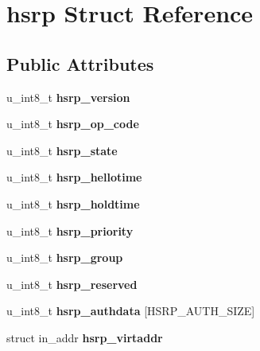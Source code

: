 \hypertarget{structhsrp}{
\section{hsrp Struct Reference}
\label{structhsrp}
}
\subsection*{Public Attributes}
\begin{DoxyCompactItemize}
\item 
\hypertarget{structhsrp_a6835c7a2ab83602e41712e873e6d8858}{
u\_\-int8\_\-t {\bfseries hsrp\_\-version}}
\label{structhsrp_a6835c7a2ab83602e41712e873e6d8858}

\item 
\hypertarget{structhsrp_a391fb22050fd87eb16694753ba115d13}{
u\_\-int8\_\-t {\bfseries hsrp\_\-op\_\-code}}
\label{structhsrp_a391fb22050fd87eb16694753ba115d13}

\item 
\hypertarget{structhsrp_a65bf3b6dafe413da5caa3d83489ac1ae}{
u\_\-int8\_\-t {\bfseries hsrp\_\-state}}
\label{structhsrp_a65bf3b6dafe413da5caa3d83489ac1ae}

\item 
\hypertarget{structhsrp_a0f004d2061c915047dce3a04b90cf6f6}{
u\_\-int8\_\-t {\bfseries hsrp\_\-hellotime}}
\label{structhsrp_a0f004d2061c915047dce3a04b90cf6f6}

\item 
\hypertarget{structhsrp_aa8f78e5e5f5c3a7278b31360f2967dc8}{
u\_\-int8\_\-t {\bfseries hsrp\_\-holdtime}}
\label{structhsrp_aa8f78e5e5f5c3a7278b31360f2967dc8}

\item 
\hypertarget{structhsrp_a4fb8b75dfc558858c1c91a1ab5b6904e}{
u\_\-int8\_\-t {\bfseries hsrp\_\-priority}}
\label{structhsrp_a4fb8b75dfc558858c1c91a1ab5b6904e}

\item 
\hypertarget{structhsrp_a153ec5534d8004a243a87ee2036f5d9a}{
u\_\-int8\_\-t {\bfseries hsrp\_\-group}}
\label{structhsrp_a153ec5534d8004a243a87ee2036f5d9a}

\item 
\hypertarget{structhsrp_a2248fbfa82e2b90f6892efc7bab2f5f1}{
u\_\-int8\_\-t {\bfseries hsrp\_\-reserved}}
\label{structhsrp_a2248fbfa82e2b90f6892efc7bab2f5f1}

\item 
\hypertarget{structhsrp_af6d0407ef6612758eff09a64dd0ef3a5}{
u\_\-int8\_\-t {\bfseries hsrp\_\-authdata} \mbox{[}HSRP\_\-AUTH\_\-SIZE\mbox{]}}
\label{structhsrp_af6d0407ef6612758eff09a64dd0ef3a5}

\item 
\hypertarget{structhsrp_a48824b2928ecf1371737a6ab9870e750}{
struct in\_\-addr {\bfseries hsrp\_\-virtaddr}}
\label{structhsrp_a48824b2928ecf1371737a6ab9870e750}

\end{DoxyCompactItemize}


